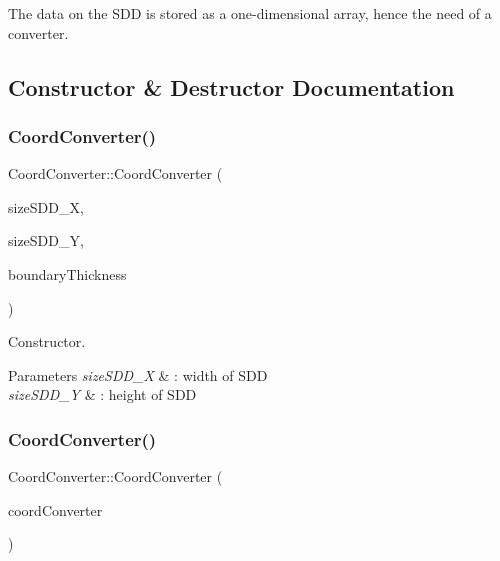 The data on the S\+DD is stored as a one-\/dimensional array, hence the need of a converter. 

\subsection{Constructor \& Destructor Documentation}
\mbox{\label{classCoordConverter_a0e773a3ee5461119d7ff285fde45427d}} 
\subsubsection{\texorpdfstring{Coord\+Converter()}{CoordConverter()}\hspace{0.1cm}{\footnotesize\ttfamily [1/2]}}
{\footnotesize\ttfamily Coord\+Converter\+::\+Coord\+Converter (\begin{DoxyParamCaption}\item[{unsigned int}]{size\+S\+D\+D\+\_\+X,  }\item[{unsigned int}]{size\+S\+D\+D\+\_\+Y,  }\item[{unsigned int}]{boundary\+Thickness }\end{DoxyParamCaption})}



Constructor. 


\begin{DoxyParams}{Parameters}
{\em size\+S\+D\+D\+\_\+X} & \+: width of S\+DD \\
\hline
{\em size\+S\+D\+D\+\_\+Y} & \+: height of S\+DD \\
\hline
\end{DoxyParams}
\mbox{\label{classCoordConverter_af11209a489a46dd335db0635d811999d}} 
\subsubsection{\texorpdfstring{Coord\+Converter()}{CoordConverter()}\hspace{0.1cm}{\footnotesize\ttfamily [2/2]}}
{\footnotesize\ttfamily Coord\+Converter\+::\+Coord\+Converter (\begin{DoxyParamCaption}\item[{const \mbox{\hyperlink{classCoordConverter}{Coord\+Converter}} \&}]{coord\+Converter }\end{DoxyParamCaption})}




